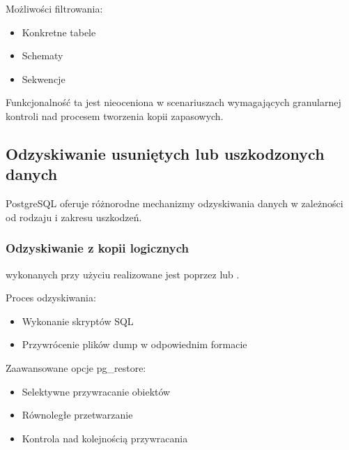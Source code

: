 \documentclass[a4paper,11pt,openany,english]{sphinxmanual}
\begin{document}
\sphinxAtStartPar
Możliwości filtrowania:
\begin{itemize}
\item {} 
\sphinxAtStartPar
Konkretne tabele

\item {} 
\sphinxAtStartPar
Schematy

\item {} 
\sphinxAtStartPar
Sekwencje

\end{itemize}

\sphinxAtStartPar
Funkcjonalność ta jest nieoceniona w scenariuszach wymagających granularnej kontroli nad procesem tworzenia kopii zapasowych.


\subsection{Odzyskiwanie usuniętych lub uszkodzonych danych}
\label{\detokenize{rozdzial2/Kopie_zapasowe_i_odzyskiwanie_danych/kopie_zapasowe_i_odzyskiwanie_danych:odzyskiwanie-usunietych-lub-uszkodzonych-danych}}
\sphinxAtStartPar
PostgreSQL oferuje różnorodne mechanizmy odzyskiwania danych w zależności od rodzaju i zakresu uszkodzeń.


\subsubsection{Odzyskiwanie z kopii logicznych}
\label{\detokenize{rozdzial2/Kopie_zapasowe_i_odzyskiwanie_danych/kopie_zapasowe_i_odzyskiwanie_danych:odzyskiwanie-z-kopii-logicznych}}
\sphinxAtStartPar
{} wykonanych przy użyciu  realizowane jest poprzez  lub .

\sphinxAtStartPar
Proces odzyskiwania:
\begin{itemize}
\item {} 
\sphinxAtStartPar
Wykonanie skryptów SQL

\item {} 
\sphinxAtStartPar
Przywrócenie plików dump w odpowiednim formacie

\end{itemize}

\sphinxAtStartPar
Zaawansowane opcje pg\_restore:
\begin{itemize}
\item {} 
\sphinxAtStartPar
Selektywne przywracanie obiektów

\item {} 
\sphinxAtStartPar
Równoległe przetwarzanie

\item {} 
\sphinxAtStartPar
Kontrola nad kolejnością przywracania

\end{itemize}
\end{document}
